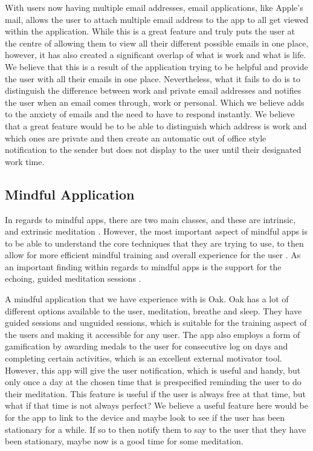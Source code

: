 \documentclass{sigchi}
\begin{document}
		With users now having multiple email addresses, email applications, like Apple's mail, allows the user to attach multiple email address to the app to all get viewed within the application. While this is a great feature and truly puts the user at the centre of allowing them to view all their different possible emails in one place, however, it has also created a significant overlap of what is work and what is life. We believe that this is a result of the application trying to be helpful and provide the user with all their emails in one place. Nevertheless, what it fails to do is to distinguish the difference between work and private email addresses and notifies the user when an email comes through, work or personal. Which we believe adds to the anxiety of emails and the need to have to respond instantly.  We believe that a great feature would be to be able to distinguish which address is work and which ones are private and then create an automatic out of office style notification to the sender but does not display to the user until their designated work time.
		
	\subsection{Mindful Application}
			
		In regards to mindful apps, there are two main classes, and these are intrinsic, and extrinsic meditation \cite{dauden2018evaluating}. However, the most important aspect of mindful apps is to be able to understand the core techniques that they are trying to use, to then allow for more efficient mindful training and overall experience for the user \cite{dauden2018evaluating}. As an important finding within regards to mindful apps is the support for the echoing, guided meditation sessions \cite{mani2015review}.
			
		A mindful application that we have experience with is Oak. Oak has a lot of different options available to the user, meditation, breathe and sleep. They have guided sessions and unguided sessions, which is suitable for the training aspect of the users and making it accessible for any user. The app also employs a form of gamification by awarding medals to the user for consecutive log on days and completing certain activities, which is an excellent external motivator tool. However, this app will give the user notification, which is useful and handy, but only once a day at the chosen time that is prespecified reminding the user to do their meditation. This feature is useful if the user is always free at that time, but what if that time is not always perfect? We believe a useful feature here would be for the app to link to the device and maybe look to see if the user has been stationary for a while. If so to then notify them to say to the user that they have been stationary, maybe now is a good time for some meditation.
			
\end{document}

